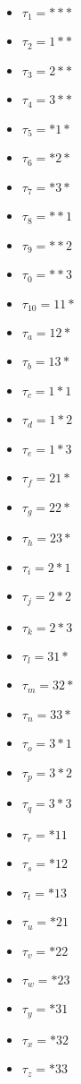 \documentclass[../main.tex]{subfiles}
\begin{document}
\begin{multicols}{4}
\begin{itemize}
    \item $\tau_1    = * * *$
    \item $\tau_2    = 1 * *$
    \item $\tau_3    = 2 * *$
    \item $\tau_4    = 3 * *$
    \item $\tau_5    = * 1 *$
    \item $\tau_6    = * 2 *$
    \item $\tau_7    = * 3 *$
    \item $\tau_8    = * * 1$
    \item $\tau_9    = * * 2$
    \item $\tau_0 = * * 3$
    \item $\tau_{10} = 1 1 *$
    \item $\tau_a = 1 2 *$
    \item $\tau_b = 1 3 *$
    \item $\tau_c = 1 * 1$
    \item $\tau_d = 1 * 2$
    \item $\tau_e = 1 * 3$
    \item $\tau_f = 2 1 *$
    \item $\tau_g = 2 2 *$
    \item $\tau_h = 2 3 *$
    \item $\tau_i = 2 * 1$
    \item $\tau_j = 2 * 2$
    \item $\tau_k = 2 * 3$
    \item $\tau_l = 3 1 *$
    \item $\tau_m = 3 2 *$
    \item $\tau_n = 3 3 *$
    \item $\tau_o = 3 * 1$
    \item $\tau_p = 3 * 2$
    \item $\tau_q = 3 * 3$
    \item $\tau_r = * 1 1$
    \item $\tau_s = * 1 2$
    \item $\tau_t = * 1 3$
    \item $\tau_u = * 2 1$
    \item $\tau_v = * 2 2$
    \item $\tau_w = * 2 3$
    \item $\tau_y = * 3 1$
    \item $\tau_x = * 3 2$
    \item $\tau_z = * 3 3$
\end{itemize}
\end{multicols}
\end{document}
